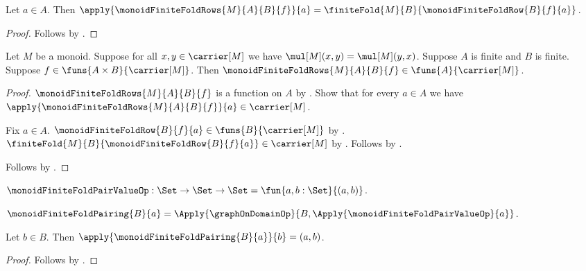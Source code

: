 \begin{proposition}\label{monoid_finite_fold_rows_apply}
    Let $a\in A$.
    Then
        $\apply{\monoidFiniteFoldRows{M}{A}{B}{f}}{a}
        =\finiteFold{M}{B}{\monoidFiniteFoldRow{B}{f}{a}}$.
\end{proposition}
\begin{proof}
    Follows by
        .
\end{proof}

\begin{proposition}\label{monoid_finite_fold_rows_type}
    Let $M$ be a monoid.
    Suppose for all $x,y\in\carrier[M]$ we have
        $\mul[M](x,y)=\mul[M](y,x)$.
    Suppose $A$ is finite and $B$ is finite.
    Suppose $f\in\funs{A\times B}{\carrier[M]}$.
    Then
        $\monoidFiniteFoldRows{M}{A}{B}{f}
            \in\funs{A}{\carrier[M]}$.
\end{proposition}
\begin{proof}
    $\monoidFiniteFoldRows{M}{A}{B}{f}$ is a function on $A$ by
        .
    Show that for every $a\in A$ we have
        $\apply{\monoidFiniteFoldRows{M}{A}{B}{f}}{a}
            \in\carrier[M]$.
    \begin{subproof}
        Fix $a\in A$.
        $\monoidFiniteFoldRow{B}{f}{a}
            \in\funs{B}{\carrier[M]}$ by
            .
        $\finiteFold{M}{B}{\monoidFiniteFoldRow{B}{f}{a}}
            \in\carrier[M]$ by
            .
        Follows by .
    \end{subproof}
    Follows by .
\end{proof}

\begin{definition}\label{monoid_finite_fold_pair_value_op}
    $\monoidFiniteFoldPairValueOp:\Set\to\Set\to\Set
        =\fun{a,b:\Set}{(a,b)}$.
\end{definition}

\begin{definition}\label{monoid_finite_fold_pairing}
    $\monoidFiniteFoldPairing{B}{a}
        =\Apply{\graphOnDomainOp}{
            B,\Apply{\monoidFiniteFoldPairValueOp}{a}}$.
\end{definition}

\begin{proposition}\label{monoid_finite_fold_pairing_apply}
    Let $b\in B$.
    Then $\apply{\monoidFiniteFoldPairing{B}{a}}{b}=(a,b)$.
\end{proposition}
\begin{proof}
    Follows by
        .
\end{proof}


